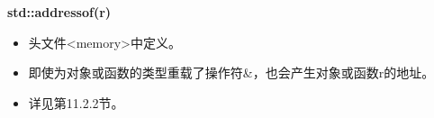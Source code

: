 \textbf{std::addressof(r)}

\begin{itemize}
\item
头文件<memory>中定义。

\item
即使为对象或函数的类型重载了操作符\&，也会产生对象或函数r的地址。

\item
详见第11.2.2节。
\end{itemize}



















